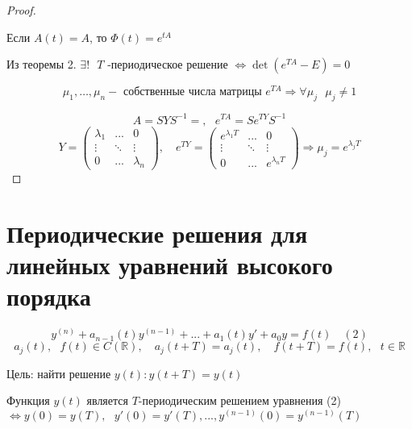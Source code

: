 \documentclass[12pt, a4paper]{report}
\begin{document}
\begin{proof} \(  \) 
    \begin{flushleft}
        Если \( A(t ) = A \), то \( \Phi (t ) = e^{ t A} \)  
    \end{flushleft}

    Из теоремы 2. \( \exists  !  \text{ }  T  \) -периодическое решение \( \Leftrightarrow  \det (e^{TA }  -E ) = 0 \)
    
    \[ \mu_1, \ldots, \mu_n - \text{ собственные числа матрицы } e^{TA} \Rightarrow \forall  \mu_j \text{ } \mu_j \neq 1    \] 

    \[ A = S  YS^{-1} = , \text{ }  e^{TA }  = Se^{TY } S^{-1}   \] 
    \[ Y= \begin{pmatrix}
    \lambda_1 & ... & 0\\
    \vdots & \ddots &     \vdots\\
    0& ... & \lambda_n
    \end{pmatrix} ,\quad  e^{ TY } = \begin{pmatrix}
        e^{\lambda_1 T}  & ... & 0\\
        \vdots & \ddots &     \vdots\\
        0& ... & e^{\lambda_nT} 
        \end{pmatrix} \Rightarrow \mu_j = e^{\lambda_j T}   \] 
\end{proof}


\section{Периодические решения для линейных уравнений высокого порядка }

\[ y^{(n )} + a_{n-1 } (t )y^{(n-1 )} + ...+ a_1(t )y ' + a_0 y = f(t )  \quad  (2)\] 
\[ a_j(t ) , \text{ } f(t ) \in C(\mathbb{R} ) , \quad  a_j (t+T ) = a_j(t ) ,\quad  f(t+T ) = f(t ) , \text{  } t \in \mathbb{R} \] 

Цель: найти решение \( y(t ) : y(t+T )= y(t )\)

\begin{theorem}
    Функция \( y(t) \) является \( T \)-периодическим решением уравнения (2) \( \Leftrightarrow  y(0 ) = y(T )  ,\text{ } y'(0 ) = y'(T ) ,..., y^{(n-1 )} (0 ) = y^{(n-1)}(T)  \)  
\end{theorem}
\end{document}
